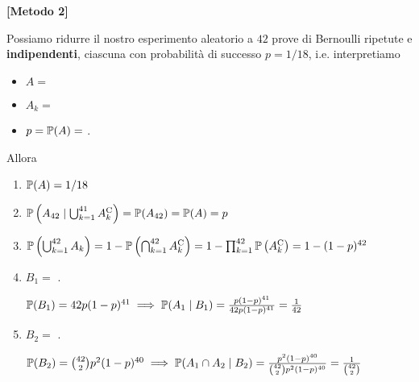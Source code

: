 \textbf{[Metodo 2]}

Possiamo ridurre il nostro esperimento aleatorio a $42$ prove di Bernoulli ripetute e \textbf{indipendenti}, ciascuna con probabilità di successo $p=1/18$, i.e. interpretiamo
\begin{itemize}
	\item $A=$ 
	\item $A_{k} =$ 
	\item $p=\mathbb{P}(A) =$ .
\end{itemize}
Allora
\begin{enumerate}
	\item $\mathbb{P}(A) =1/18$
	\item $\mathbb{P}\left(A_{42} \mid \bigcup _{k=1}^{41} A_{k}^{\mathrm{C}}\right) =\mathbb{P}(A_{42}) =\mathbb{P}(A) =p$
	\item $\mathbb{P}\left(\bigcup _{k=1}^{42} A_{k}\right) =1-\mathbb{P}\left(\bigcap _{k=1}^{42} A_{k}^{\mathrm{C}}\right) =1-\prod _{k=1}^{42}\mathbb{P}\left(A_{k}^{\mathrm{C}}\right) =1-(1-p)^{42}$
	\item $B_{1} =$ .

	$\mathbb{P}(B_{1}) =42p(1-p)^{41} \implies \mathbb{P}(A_{1} \mid B_{1}) =\frac{p(1-p)^{41}}{42p(1-p)^{41}} =\frac{1}{42}$
	\item $B_{2} =$ .

	$\mathbb{P}(B_{2}) =\binom{42}{2} p^{2}(1-p)^{40} \implies \mathbb{P}(A_{1} \cap A_{2} \mid B_{2}) =\frac{p^{2}(1-p)^{40}}{\binom{42}{2} p^{2}(1-p)^{40}} =\frac{1}{\binom{42}{2}}$
\end{enumerate}

\Soluzione

